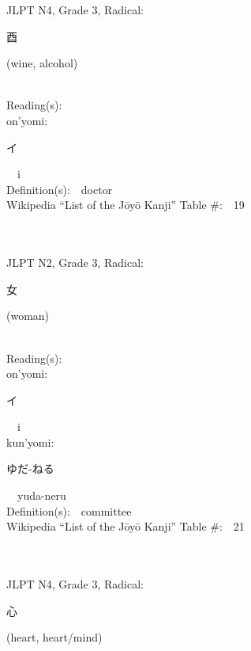 \begin{multicols}{2}
{JLPT N4, Grade 3, Radical:\ \ {\begin{CJK}{UTF8}{min} 酉 \end{CJK}} (wine, alcohol) } \\
Reading(s):\ \ \\
{\hspace*{1em}}on'yomi:\ \ \\
{\hspace*{2em}}{\begin{CJK}{UTF8}{min} イ \end{CJK}}\ \ i\ \ \\
Definition(s):\ \ doctor \\
Wikipedia ``List of the J\=oy\=o Kanji'' Table \#:\ \ 19 \\
\ \ \\
{\fontsize{34pt}{40pt}  }\ \ \\  %
{JLPT N2, Grade 3, Radical:\ \ {\begin{CJK}{UTF8}{min} 女 \end{CJK}} (woman) } \\
Reading(s):\ \ \\
{\hspace*{1em}}on'yomi:\ \ \\
{\hspace*{2em}}{\begin{CJK}{UTF8}{min} イ \end{CJK}}\ \ i\ \ \\
{\hspace*{1em}}kun'yomi:\ \ \\
{\hspace*{2em}}{\begin{CJK}{UTF8}{min} ゆだ-ねる \end{CJK}}\ \ yuda-neru\ \ \\
Definition(s):\ \ committee \\
Wikipedia ``List of the J\=oy\=o Kanji'' Table \#:\ \ 21 \\
\ \ \\
{\fontsize{34pt}{40pt}  }\ \ \\  %
{JLPT N4, Grade 3, Radical:\ \ {\begin{CJK}{UTF8}{min} 心 \end{CJK}} (heart, heart/mind) } \\

\end{multicols}
